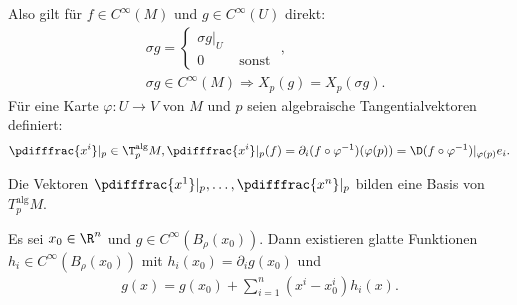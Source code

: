 \begin{bem}
  Also gilt für $f \in C^{\infty}(M)$ und $g \in C^{\infty}(U)$ direkt:
  \begin{align*}
    & \sigma g =
    \begin{cases}
      \sigma g|_U & \\
      0 & \text{ sonst }
    \end{cases},\\
    & \sigma g \in C^{\infty}(M) 
    \Rightarrow X_p(g) = X_p(\sigma g).
  \end{align*}
  Für eine Karte $\varphi \colon U \to V$ von $M$ und $p$ seien algebraische Tangentialvektoren definiert:
  \begin{align*}
    \pdifffrac{x^i}|_p \in \T_p^{\text{alg}}M, \pdifffrac{x^i}|_p(f) = \partial_i(f \circ \varphi^{-1})(\varphi(p)) = \D(f \circ \varphi^{-1})|_{\varphi(p)}e_i.
  \end{align*}
\end{bem}

\begin{satz}
  Die Vektoren $\pdifffrac{x^1}|_p,\ldots,\pdifffrac{x^n}|_p$ bilden eine Basis von $T_p^{\text{alg}}M$.
\end{satz}

\begin{lemma}
  Es sei $x_0 \in \R^n$ und $g \in C^{\infty}(B_{\rho}(x_0))$.
  Dann existieren glatte Funktionen $h_i \in C^{\infty}(B_{\rho}(x_0))$ mit $h_i(x_0) = \partial_ig(x_0)$ und 
  \begin{align*}
    g(x) = g(x_0) + \sum_{i=1}^n(x^i-x_0^i)h_i(x).
  \end{align*}
\end{lemma}

